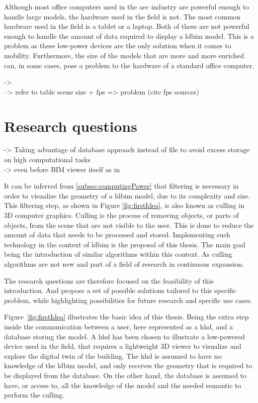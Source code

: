 Although most office computers used in the \ac{aec} industry are powerful enough to handle large models, the hardware used in the field is not. The most common hardware used in the field is a tablet or a laptop. Both of these are not powerful enough to handle the amount of data required to display a \ac{ldbim} model. This is a problem as these low-power devices are the only solution when it comes to mobility. Furthermore, the size of the models that are more and more enriched can, in some cases, pose a problem to the hardware of a standard office computer.

-> \cite{Johansson2015} \\
--> refer to table scene size + fps => problem (cite fps sources)

\section{Research questions}
-> Taking advantage of database approach instead of file to avoid excess storage on high computational tasks\\
-> even before BIM viewer itself as in \cite{Johansson2015}

It can be inferred from \ref{subsec:computingPower} that filtering is necessary in order to visualize the geometry of a \ac{ldbim} model, due to its complexity and size. This filtering step, as shown in Figure \ref{fig:firstIdea}, is also known as culling in 3D computer graphics. Culling is the process of removing objects, or parts of objects, from the scene that are not visible to the user. This is done to reduce the amount of data that needs to be processed and stored. Implementing such technology in the context of \ac{ldbim} is the proposal of this thesis. The main goal being the introduction of similar algorithms within this context. As culling algorithms are not new and part of a field of research in continuous expansion.

The research questions are therefore focused on the feasibility of this introduction. And propose a set of possible solutions tailored to this specific problem, while highlighting possibilities for future research and specific use cases.

Figure~\ref{fig:firstIdea} illustrates the basic idea of this thesis. Being the extra step inside the communication between a user, here represented as a \ac{hhd}, and a database storing the model. A \ac{hhd} has been chosen to illustrate a low-powered device used in the field, that requires a lightweight 3D viewer to visualize and explore the digital twin of the building. The \ac{hhd} is assumed to have no knowledge of the \ac{ldbim} model, and only receives the geometry that is required to be displayed from the database. On the other hand, the database is assumed to have, or access to, all the knowledge of the model and the needed semantic to perform the culling.

